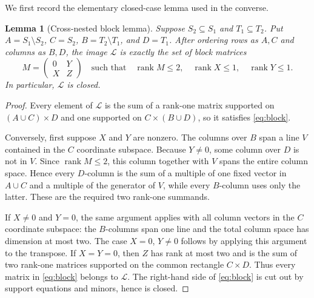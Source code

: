 \documentclass[11pt]{article}
\newtheorem{lemma}{Lemma}
\newcommand{\rank}{\operatorname{rank}}
\begin{document}
We first record the elementary closed-case lemma used in the converse.

\begin{lemma}[Cross-nested block lemma]\label{lem:block}
Suppose $S_2\subseteq S_1$ and $T_1\subseteq T_2$. Put
$A=S_1\setminus S_2$, $C=S_2$, $B=T_2\setminus T_1$, and $D=T_1$.
After ordering rows as $A,C$ and columns as $B,D$, the image $\mathcal L$ is
exactly the set of block matrices
\[
 M=\begin{pmatrix}0&Y\\X&Z\end{pmatrix}
 \quad\text{such that}\quad
 \rank M\le2,\quad\rank X\le1,\quad\rank Y\le1. \tag{2}\label{eq:block}
\]
In particular, $\mathcal L$ is closed.
\end{lemma}

\begin{proof}
Every element of $\mathcal L$ is the sum of a rank-one matrix supported on
$(A\cup C)\times D$ and one supported on $C\times(B\cup D)$, so it satisfies
\eqref{eq:block}.

Conversely, first suppose $X$ and $Y$ are nonzero. The columns over $B$ span a
line $V$ contained in the $C$ coordinate subspace. Because $Y\ne0$, some
column over $D$ is not in $V$. Since $\rank M\le2$, this column together with
$V$ spans the entire column space. Hence every $D$-column is the sum of a
multiple of one fixed vector in $A\cup C$ and a multiple of the generator of
$V$, while every $B$-column uses only the latter. These are the required two
rank-one summands.

If $X\ne0$ and $Y=0$, the same argument applies with all column vectors in the
$C$ coordinate subspace: the $B$-columns span one line and the total column
space has dimension at most two. The case $X=0$, $Y\ne0$ follows by applying
this argument to the transpose. If $X=Y=0$, then $Z$ has rank at most two and
is the sum of two rank-one matrices supported on the common rectangle
$C\times D$. Thus every matrix in \eqref{eq:block} belongs to $\mathcal L$.
The right-hand side of \eqref{eq:block} is cut out by support equations and
minors, hence is closed.
\end{proof}
\end{document}

